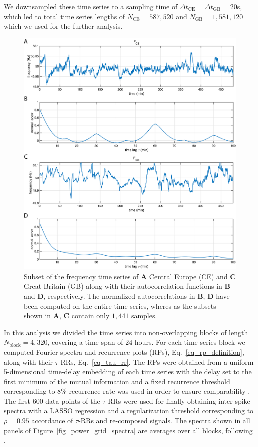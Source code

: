 \documentclass[entropy,article,submit,pdftex,moreauthors]{Definitions/mdpi}
\begin{document}
We downsampled these time series to a sampling time of $\Delta t_{\text{CE}}= \Delta t_{\text{GB}}=20$\si{s}, which led to total time series lengths of 
$N_{\text{CE}}=587,520$ and $N_{\text{GB}}=1,581,120$ which we used for the further analysis.

\begin{figure}
 \centering
 \includegraphics[width=\textwidth]{./figures/fig_power_grid_time_series}
 \caption{Subset of the frequency time series of \textbf{A} Central Europe (CE) \cite{haehne2018footprint} and \textbf{C} Great Britain (GB) \cite{GB} along with their autocorrelation functions in \textbf{B} and 
 \textbf{D}, respectively. The normalized autocorrelations in \textbf{B}, \textbf{D} have been computed on the entire time series, wheres as the subsets shown in \textbf{A}, \textbf{C} 
 contain only $1,441$ samples.}
\label{fig_power_grid_time_series}
\end{figure}

In this analysis we divided the time series into 
non-overlapping blocks of length $N_{\text{block}}=4,320$, covering a time span of $24$ hours. For each time series block we computed Fourier spectra and recurrence plots (RPs), 
Eq.~\eqref{eq_rp_definition}, along with their $\tau$-RRs, Eq.~\ref{eq_tau_rr}. The RPs were obtained from a uniform 5-dimensional time-delay embedding of each time series with 
the delay set to the first minimum of the mutual information \cite{fraser1986,hegger1999} and a fixed recurrence threshold corresponding to 8\% recurrence rate was used in order 
to ensure comparability \cite{kraemer2018}. The first $600$ data points of the $\tau$-RRs were used for finally obtaining inter-spike spectra with a LASSO regression and a 
regularization threshold corresponding to $\rho=0.95$ accordance of $\tau$-RRs and re-composed signals. The spectra shown in all panels of Figure~\ref{fig_power_grid_spectra} 
are averages over all blocks, following \citet{meyer2020identifying}.
\end{document}
